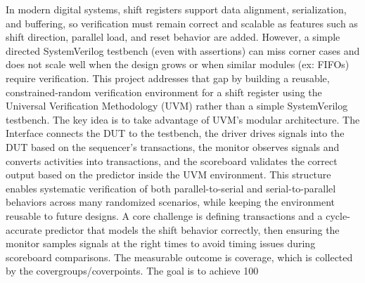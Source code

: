 In modern digital systems, shift registers support data alignment, serialization, and buffering, so verification must remain correct and scalable as features such as shift direction, parallel load, and reset behavior are added. However, a simple directed SystemVerilog testbench (even with assertions) can miss corner cases and does not scale well when the design grows or when similar modules (ex: FIFOs) require verification. This project addresses that gap by building a reusable, constrained-random verification environment for a shift register using the Universal Verification Methodology (UVM) rather than a simple SystemVerilog testbench.
The key idea is to take advantage of UVM’s modular architecture. The Interface connects the DUT to the testbench, the driver drives signals into the DUT based on the sequencer’s transactions, the monitor observes signals and converts activities into transactions, and the scoreboard validates the correct output based on the predictor inside the UVM environment. This structure enables systematic verification of both parallel-to-serial and serial-to-parallel behaviors across many randomized scenarios, while keeping the environment reusable to future designs. A core challenge is defining transactions and a cycle-accurate predictor that models the shift behavior correctly, then ensuring the monitor samples signals at the right times to avoid timing issues during scoreboard comparisons.
The measurable outcome is coverage, which is collected by the covergroups/coverpoints. The goal is to achieve 100%

\lipsum[1]
